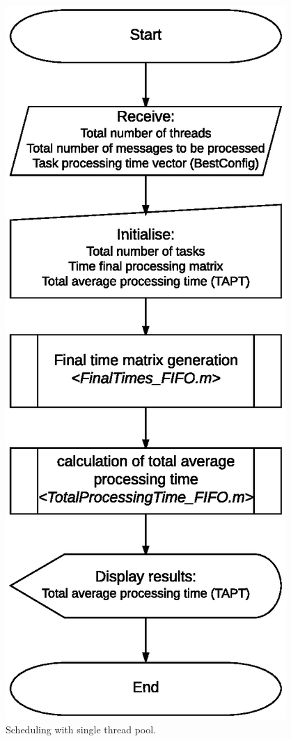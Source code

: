 \begin{figure}[h]
\centering
 \includegraphics[width=0.7\linewidth]{./figs/fluxogram_FIFO.eps}
 \caption{Scheduling with single thread pool.}
\label{fig:fluxogram_FIFO}
\end{figure}
%
